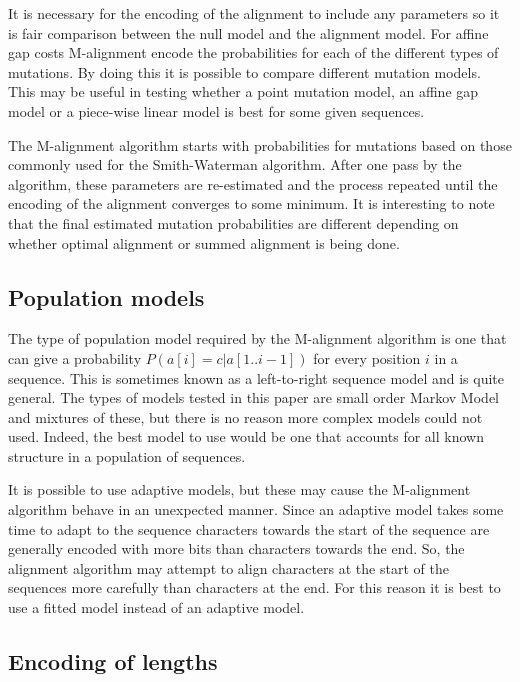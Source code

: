 \documentclass[letterpaper,11pt,oneside]{article}
\begin{document}
It is necessary for the encoding of the alignment to include any parameters so
it is fair comparison between the null model and the alignment model.  For
affine gap costs M-alignment encode the probabilities for each of the
different types of mutations.  By doing this it is possible to compare
different mutation models.  This may be useful in testing whether a point
mutation model, an affine gap model or a piece-wise linear model is best for
some given sequences.

The M-alignment algorithm starts with probabilities for mutations based on
those commonly used for the Smith-Waterman algorithm.  After one pass by the
algorithm, these parameters are re-estimated and the process repeated until
the encoding of the alignment converges to some minimum.  It is interesting to
note that the final estimated mutation probabilities are different depending
on whether optimal alignment or summed alignment is being done.



\subsection{Population models}

The type of population model required by the M-alignment algorithm is one that
can give a probability $P(a[i]=c|a[1..i-1])$ for every position $i$ in a
sequence.  This is sometimes known as a left-to-right sequence model and is
quite general.  The types of models tested in this paper are small order
Markov Model and mixtures of these, but there is no reason more complex models
could not used.  Indeed, the best model to use would be one that accounts for
all known structure in a population of sequences.

It is possible to use adaptive models, but these may cause the M-alignment
algorithm behave in an unexpected manner.  Since an adaptive model takes some
time to adapt to the sequence characters towards the start of the sequence are
generally encoded with more bits than characters towards the end.  So, the
alignment algorithm may attempt to align characters at the start of the
sequences more carefully than characters at the end.  For this reason it is
best to use a fitted model instead of an adaptive model.

\subsection{Encoding of lengths}
\end{document}
